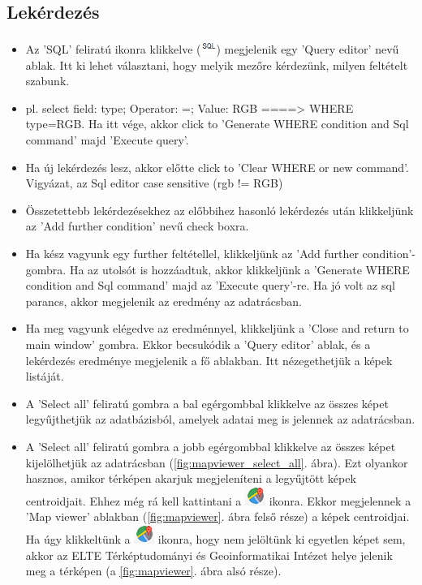 \documentclass[a4paper,12pt]{article}
\begin{document}
\subsection{Lekérdezés}

\begin{itemize}
	\item  Az 'SQL' feliratú ikonra klikkelve (\includegraphics[width=0.5cm]{sql.png}) megjelenik egy 'Query editor' nevű ablak. Itt ki lehet választani, hogy melyik mezőre kérdezünk, milyen feltételt szabunk.
	
	\item pl. select field: type;  Operator: =; Value: RGB ====> WHERE type=RGB. Ha itt vége, akkor click to 'Generate WHERE condition and Sql command' majd 'Execute query'. 
	
	\item Ha új lekérdezés lesz, akkor előtte click to 'Clear WHERE or new command'. Vigyázat, az Sql editor case sensitive (rgb !=  RGB)
	
	\item Összetettebb lekérdezésekhez az előbbihez hasonló lekérdezés után klikkeljünk az 'Add further condition' nevű check boxra. 
	
	\item Ha kész vagyunk egy further feltétellel, klikkeljünk az 'Add further condition'- gombra. Ha az utolsót is hozzáadtuk, akkor klikkeljünk a 'Generate WHERE condition and Sql command' majd az 'Execute query'-re. Ha jó volt az sql parancs, akkor megjelenik az eredmény az adatrácsban.
	
	\item Ha meg vagyunk elégedve az eredménnyel, klikkeljünk a 'Close and return to main window' gombra. Ekkor becsukódik a 'Query editor' ablak, és a lekérdezés eredménye megjelenik a fő ablakban. Itt nézegethetjük a képek listáját.
	
	\item A 'Select all' feliratú gombra a bal egérgombbal klikkelve az összes képet legyűjthetjük az adatbázisból, amelyek adatai meg is jelennek az adatrácsban.
	
	\item A 'Select all' feliratú gombra a jobb egérgombbal klikkelve az összes képet kijelölhetjük az  adatrácsban (\ref{fig:mapviewer_select_all}. ábra). Ezt olyankor hasznos, amikor térképen akarjuk megjeleníteni a legyűjtött képek centroidjait. Ehhez még rá kell kattintani a \includegraphics[width = 0.5 cm]{mapviewer_ikon.png} ikonra. Ekkor megjelennek a 'Map viewer' ablakban (\ref{fig:mapviewer}. ábra felső része) a képek centroidjai. Ha úgy klikkeltünk a \includegraphics[width = 0.5 cm]{mapviewer_ikon.png} ikonra, hogy nem jelöltünk ki egyetlen képet sem, akkor az ELTE Térképtudományi és Geoinformatikai Intézet helye jelenik meg a térképen (a \ref{fig:mapviewer}. ábra alsó része).
	

\end{itemize}
\end{document}
